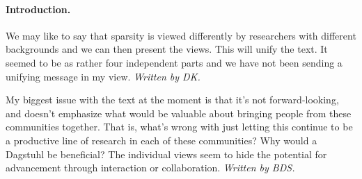\paragraph*{Introduction.}

We may like to say that sparsity is viewed differently by researchers with different backgrounds and
we can then present the views. This will unify the text. It seemed to be as rather four independent parts and
we have not been sending a unifying message in my view. \emph{Written by DK.}

My biggest issue with the text at the moment is that it's not forward-looking, and doesn't emphasize what would be valuable
about bringing people from these communities together. That is, what's wrong with just letting this continue to be a
productive line of research in each of these communities? Why would a Dagstuhl be beneficial? The individual views
seem to hide the potential for advancement through interaction or collaboration.  \emph{Written by BDS.}

